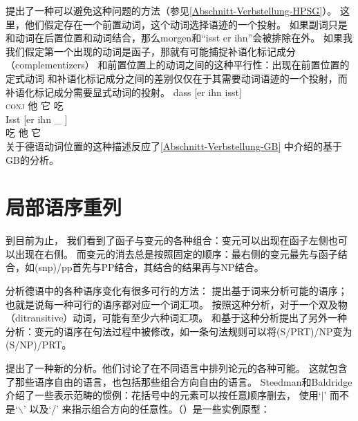 \zl
\citet{KW91a}提出了一种可以避免这种问题的方法（参见\ref{Abschnitt-Verbstellung-HPSG}）。
这里，他们假定存在一个前置动词，这个动词选择语迹的一个投射。
如果副词只是和动词在后置位置和动词结合，那么morgen和“isst er ihn”会被排除在外。
如果我我们假定第一个出现的动词是函子，那就有可能捕捉补语化标记成分（complementizers）
和前置位置上的动词之间的这种平行性\citep{Hoehle97a}：出现在前置位置的定式动词
和补语化标记成分之间的差别仅仅在于其需要动词语迹的一个投射，而补语化标记成分需要显式动词的投射。
\eal
\ex 
\gll dass [er ihn isst]\\
     \textsc{conj} \spacebr{}他 它 吃\\
\ex 
\gll Isst [er ihn \_ ]\\
     吃 \spacebr{}他 它 \\
\zl
关于德语动词位置的这种描述反应了\ref{Abschnitt-Verbstellung-GB}
中介绍的基于GB的分析。

\section{局部语序重列}
\label{Abschnitt-CG-lokale-Umstellung}

到目前为止，
我们看到了函子与变元的各种组合：变元可以出现在函子左侧也可以出现在右侧。
而变元的消去总是按照固定的顺序：最右侧的变元最先与函子结合，如(s\bs np)/pp首先与PP结合，其结合的结果再与NP结合。 

分析德语中的各种语序变化有很多可行的方法：
\citet{Uszkoreit86b}提出基于词来分析可能的语序；也就是说每一种可行的语序都对应一个词汇项。
按照这种分析，对于一个双及物（ditransitive）动词，可能有至少六种词汇项。
\citet[]{Briscoe2000a}和\citet[--98]{Villavicencio2002a}基于这种分析提出了另外一种分析：变元的语序在句法过程中被修改，如一条句法规则可以将(S/PRT)/NP变为(S/NP)/PRT。

\citet{SB2006a-u}提出了一种新的分析。他们讨论了在不同语言中排列论元的各种可能。
这就包含了那些语序自由的语言，也包括那些组合方向自由的语言。
Steedman和Baldridge介绍了一些表示范畴的惯例：花括号中的元素可以按任意顺序删去，
使用`$|$'
\isc{$\vert$}\is{$\vert$}而不是`$\backslash$'
\isc{$\backslash$}\is{$\backslash$}以及`/'
\isc{/}\is{/}来指示组合方向的任意性。（）是一些实例原型：

